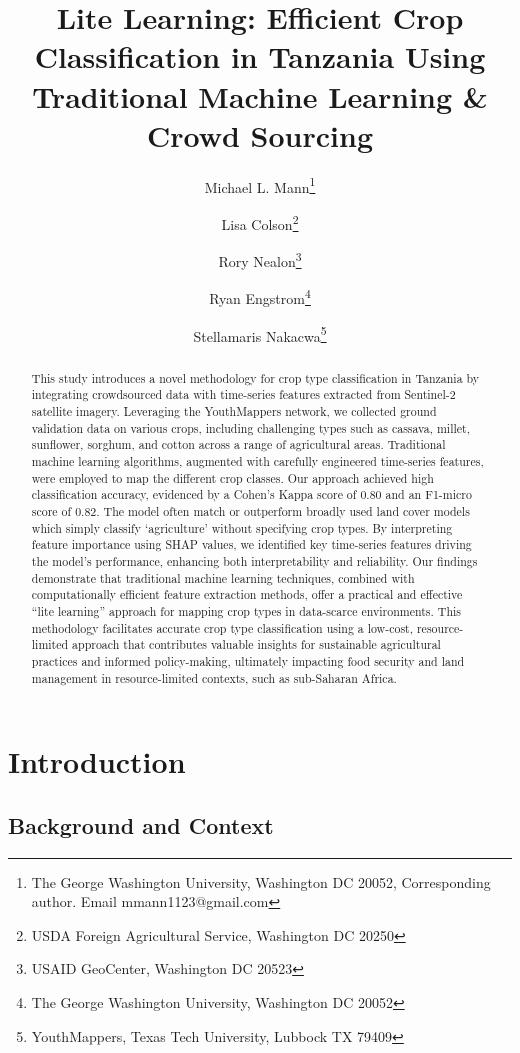 \documentclass[
]{article}
\title{Lite Learning: Efficient Crop Classification in Tanzania Using
Traditional Machine Learning \& Crowd Sourcing}
\author{
Michael L. Mann\thanks{The George Washington University, Washington DC
20052, Corresponding author. Email mmann1123@gmail.com} \and 
Lisa Colson\thanks{USDA Foreign Agricultural Service, Washington DC
20250} \and 
Rory Nealon\thanks{USAID GeoCenter, Washington DC 20523} \and 
Ryan Engstrom\thanks{The George Washington University, Washington DC
20052} \and 
Stellamaris Nakacwa\thanks{YouthMappers, Texas Tech University, Lubbock
TX 79409}}
\date{}
\begin{document}
\maketitle
\begin{abstract}
This study introduces a novel methodology for crop type classification
in Tanzania by integrating crowdsourced data with time-series features
extracted from Sentinel-2 satellite imagery. Leveraging the YouthMappers
network, we collected ground validation data on various crops, including
challenging types such as cassava, millet, sunflower, sorghum, and
cotton across a range of agricultural areas. Traditional machine
learning algorithms, augmented with carefully engineered time-series
features, were employed to map the different crop classes. Our approach
achieved high classification accuracy, evidenced by a Cohen's Kappa
score of 0.80 and an F1-micro score of 0.82. The model often match or
outperform broadly used land cover models which simply classify
`agriculture' without specifying crop types. By interpreting feature
importance using SHAP values, we identified key time-series features
driving the model's performance, enhancing both interpretability and
reliability. Our findings demonstrate that traditional machine learning
techniques, combined with computationally efficient feature extraction
methods, offer a practical and effective ``lite learning'' approach for
mapping crop types in data-scarce environments. This methodology
facilitates accurate crop type classification using a low-cost,
resource-limited approach that contributes valuable insights for
sustainable agricultural practices and informed policy-making,
ultimately impacting food security and land management in
resource-limited contexts, such as sub-Saharan Africa.
\end{abstract}

\linenumbers  
\modulolinenumbers[1]  
\pagewiselinenumbers  
{}
\captionsetup{justification=raggedright, singlelinecheck=false}

\hypertarget{introduction}{%
\section{Introduction}\label{introduction}}

\hypertarget{background-and-context}{%
\subsection{Background and Context}\label{background-and-context}}
\end{document}
